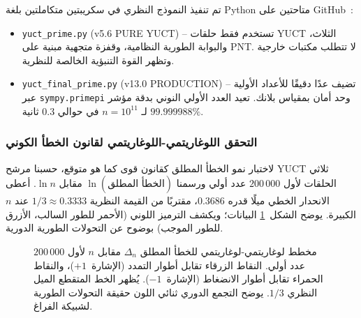 \documentclass[11pt,a4paper]{article}
\begin{document}
	تم تنفيذ النموذج النظري في سكريبتين متكاملتين بلغة Python متاحتين على GitHub~\cite{PrimeRepo}:
	\begin{itemize}
		\item \texttt{yuct\_prime.py} (v5.6 PURE YUCT) -- تستخدم فقط حلقات YUCT الثلاث، والبوابة الطورية النظامية، وقفزة متجهية مبنية على PNT. لا تتطلب مكتبات خارجية وتظهر القوة التنبؤية الخالصة للنظرية.
		\item \texttt{yuct\_final\_prime.py} (v13.0 PRODUCTION) -- تضيف عدًا دقيقًا للأعداد الأولية عبر \texttt{sympy.primepi} وحد أمان بمقياس بلانك. تعيد العدد الأولي النوني بدقة مؤشر \(99.999988\%\) لـ \(n=10^{11}\) في حوالي \(0.3\) ثانية.
	\end{itemize}
	
	\subsubsection{التحقق اللوغاريتمي-اللوغاريتمي لقانون الخطأ الكوني}
	
	لاختبار نمو الخطأ المطلق كقانون قوى كما هو متوقع، حسبنا مرشح YUCT ثلاثي الحلقات لأول \(200\,000\) عدد أولي ورسمنا \(\ln(\text{الخطأ المطلق})\) مقابل \(\ln n\). أعطى الانحدار الخطي ميلًا قدره \(0.3686\)، مقتربًا من القيمة النظرية \(1/3 \approx 0.3333\) عند \(n\) الكبيرة. يوضح الشكل~\ref{fig:loglog} البيانات؛ ويكشف الترميز اللوني (الأحمر للطور السالب، الأزرق للطور الموجب) بوضوح عن التحولات الطورية الدورية.
	
	\begin{figure}[htbp]
		\centering
		\caption{مخطط لوغاريتمي-لوغاريتمي للخطأ المطلق \(\Delta_n\) مقابل \(n\) لأول \(200\,000\) عدد أولي. النقاط الزرقاء تقابل أطوار التمدد (الإشارة~\(+1\))، والنقاط الحمراء تقابل أطوار الانضغاط (الإشارة~\(-1\)). يُظهر الخط المتقطع الميل النظري \(1/3\). يوضح التجمع الدوري ثنائي اللون حقيقة التحولات الطورية لشبيكة الفراغ.}
		\label{fig:loglog}
	\end{figure}
	
\end{document}
